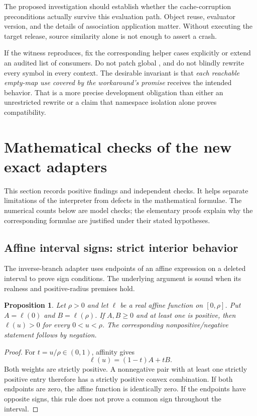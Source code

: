 \documentclass[11pt,letterpaper]{article}
\newcommand{\code}[1]{\texttt{\detokenize{#1}}}
\newtheorem{proposition}{Proposition}
\begin{document}
The proposed investigation should establish whether the cache-corruption preconditions actually survive this evaluation path. Object reuse, evaluator version, and the details of association application matter. Without executing the target release, source similarity alone is not enough to assert a crash.

If the witness reproduces, fix the corresponding helper cases explicitly or extend an audited list of consumers. Do not patch global \code{System`Map}, and do not blindly rewrite every symbol in every context. The desirable invariant is that \emph{each reachable empty-map use covered by the workaround's promise} receives the intended behavior. That is a more precise development obligation than either an unrestricted rewrite or a claim that namespace isolation alone proves compatibility.

\section{Mathematical checks of the new exact adapters}
\label{sec:math}

This section records positive findings and independent checks. It helps separate limitations of the interpreter from defects in the mathematical formulae. The numerical counts below are model checks; the elementary proofs explain why the corresponding formulae are justified under their stated hypotheses.

\subsection{Affine interval signs: strict interior behavior}

The inverse-branch adapter uses endpoints of an affine expression on a deleted interval to prove sign conditions. The underlying argument is sound when its realness and positive-radius premises hold.~\cite{mbranches}

\begin{proposition}
Let $\rho>0$ and let $\ell$ be a real affine function on $[0,\rho]$. Put $A=\ell(0)$ and $B=\ell(\rho)$. If $A,B\geq0$ and at least one is positive, then $\ell(u)>0$ for every $0<u<\rho$. The corresponding nonpositive/negative statement follows by negation.
\end{proposition}
\begin{proof}
For $t=u/\rho\in(0,1)$, affinity gives
\[
 \ell(u)=(1-t)A+tB.
\]
Both weights are strictly positive. A nonnegative pair with at least one strictly positive entry therefore has a strictly positive convex combination. If both endpoints are zero, the affine function is identically zero. If the endpoints have opposite signs, this rule does not prove a common sign throughout the interval.
\end{proof}
\end{document}
